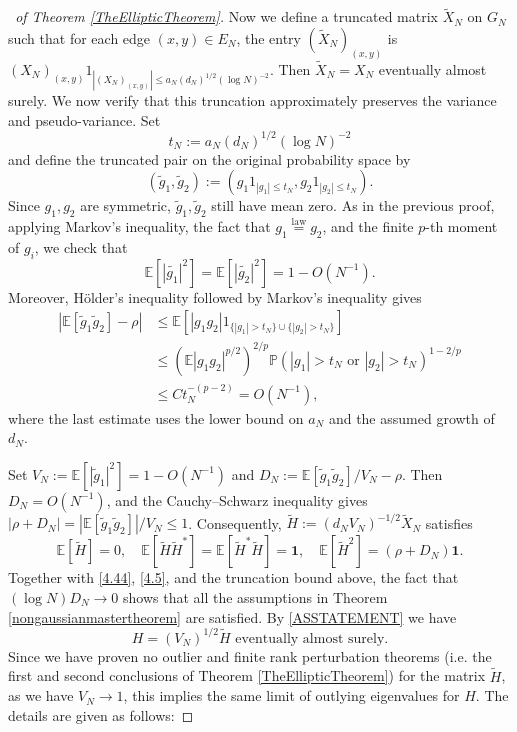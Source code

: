 \documentclass[11pt,reqno]{amsart}
\theoremstyle{plain}
\theoremstyle{remark}
\numberwithin{equation}{section}
\begin{document}
\begin{proof}[\proofname\ of Theorem \ref{TheEllipticTheorem}]
 
   Now we define a truncated matrix $\widetilde{X}_N$ on $G_N$ such that for each edge $(x,y)\in E_N$, the entry $(\widetilde{X}_N)_{(x,y)}$ is $(X_N)_{(x,y)}1_{|(X_N)_{(x,y)}|\leq a_N(d_N)^{1/2}(\log N)^{-2}}$. Then $\widetilde{X}_N=X_N$ eventually almost surely. We now verify that this truncation approximately preserves the variance and pseudo-variance. Set
\[
t_N:=a_N(d_N)^{1/2}(\log N)^{-2}
\]
and define the truncated pair on the original probability space by
\[
(\widetilde{g}_1,\widetilde{g}_2):=
(g_1 1_{|g_1|\leq t_N},g_2 1_{|g_2|\leq t_N}).
\]
Since $g_1,g_2$ are symmetric, $\widetilde{g}_1,\widetilde{g}_2$ still have mean zero. As in the previous proof, applying Markov's inequality, the fact that $g_1\stackrel{\text{law}}{=}g_2$, and the finite $p$-th moment of $g_i$, we check that 
$$
\mathbb{E}[|\widetilde{g_1}|^2]=\mathbb{E}[|\widetilde{g_2}|^2]=1-O(N^{-1}).
$$
Moreover, H\"older's inequality followed by Markov's inequality gives
\[
\begin{aligned}
\left|\mathbb{E}[\widetilde{g}_1\widetilde{g}_2]-\rho\right|
&\leq \mathbb{E}\left[|g_1g_2|1_{\{|g_1|>t_N\}\cup\{|g_2|>t_N\}}\right]\\
&\leq \left(\mathbb{E}|g_1g_2|^{p/2}\right)^{2/p}
\mathbb{P}\left(|g_1|>t_N\text{ or }|g_2|>t_N\right)^{1-2/p}\\
&\leq C t_N^{-(p-2)}=O(N^{-1}),
\end{aligned}
\]
where the last estimate uses the lower bound on $a_N$ and the assumed growth of $d_N$.



   Set $V_N:=\mathbb{E}[|\widetilde{g}_1|^2]=1-O(N^{-1})$ and
   $D_N:=\mathbb{E}[\widetilde{g}_1\widetilde{g}_2]/V_N-\rho$. Then $D_N=O(N^{-1})$, and the Cauchy--Schwarz inequality gives $|\rho+D_N|=|\mathbb{E}[\widetilde{g}_1\widetilde{g}_2]|/V_N\leq 1$. Consequently, $\widetilde{H}:=(d_NV_N)^{-1/2}\widetilde{X}_N$ satisfies
   $$\mathbb{E}[\widetilde{H}]=0,\quad\mathbb{E}[\widetilde{H}\widetilde{H}^*]=\mathbb{E}[\widetilde{H}^*\widetilde{H}]=\mathbf{1},\quad\mathbb{E}[\widetilde{H}^2]=(\rho+D_N)\mathbf{1}.
   $$
   Together with \eqref{4.44}, \eqref{4.5}, and the truncation bound above, the fact that $(\log N)D_N\to 0$ shows that all the assumptions in Theorem \ref{nongaussianmastertheorem} are satisfied. By \eqref{ASSTATEMENT} we have $$H=(V_N)^{1/2}\widetilde{H}\text{ eventually almost surely}.$$ Since we have proven no outlier and finite rank perturbation theorems (i.e. the first and second conclusions of Theorem \ref{TheEllipticTheorem}) for the matrix $\widetilde{H}$, as we have $V_N\to 1$, this implies the same limit of outlying eigenvalues for $H$. The details are given as follows:
   

\end{proof}
\end{document}
